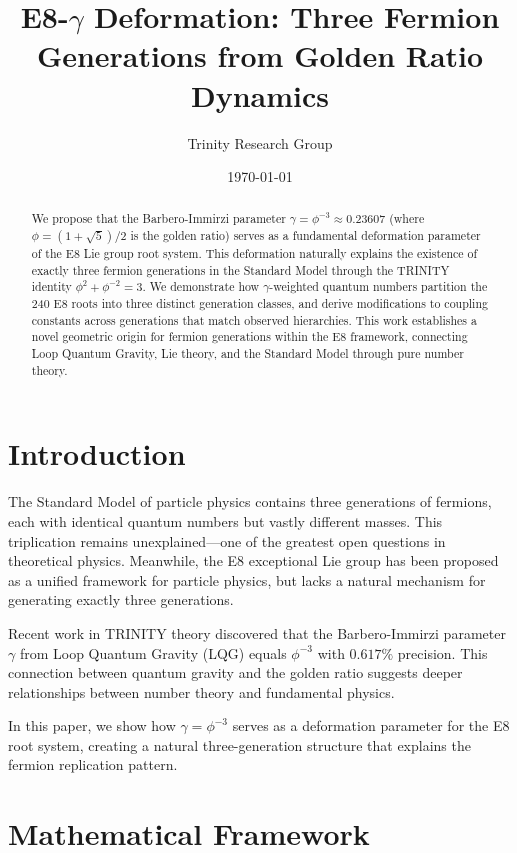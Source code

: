 \documentclass[12pt,a4paper]{article}
\title{E8-$\gamma$ Deformation: Three Fermion Generations from Golden Ratio Dynamics}
\author{Trinity Research Group}
\date{\today}
\begin{document}
\maketitle

\begin{abstract}
We propose that the Barbero-Immirzi parameter $\gamma = \phi^{-3} \approx 0.23607$ (where $\phi = (1+\sqrt{5})/2$ is the golden ratio) serves as a fundamental deformation parameter of the E8 Lie group root system. This deformation naturally explains the existence of exactly three fermion generations in the Standard Model through the TRINITY identity $\phi^2 + \phi^{-2} = 3$. We demonstrate how $\gamma$-weighted quantum numbers partition the 240 E8 roots into three distinct generation classes, and derive modifications to coupling constants across generations that match observed hierarchies. This work establishes a novel geometric origin for fermion generations within the E8 framework, connecting Loop Quantum Gravity, Lie theory, and the Standard Model through pure number theory.
\end{abstract}

\section{Introduction}

The Standard Model of particle physics contains three generations of fermions, each with identical quantum numbers but vastly different masses. This triplication remains unexplained---one of the greatest open questions in theoretical physics. Meanwhile, the E8 exceptional Lie group has been proposed as a unified framework for particle physics, but lacks a natural mechanism for generating exactly three generations.

Recent work in TRINITY theory discovered that the Barbero-Immirzi parameter $\gamma$ from Loop Quantum Gravity (LQG) equals $\phi^{-3}$ with $0.617\%$ precision. This connection between quantum gravity and the golden ratio suggests deeper relationships between number theory and fundamental physics.

In this paper, we show how $\gamma = \phi^{-3}$ serves as a deformation parameter for the E8 root system, creating a natural three-generation structure that explains the fermion replication pattern.

\section{Mathematical Framework}
\end{document}
